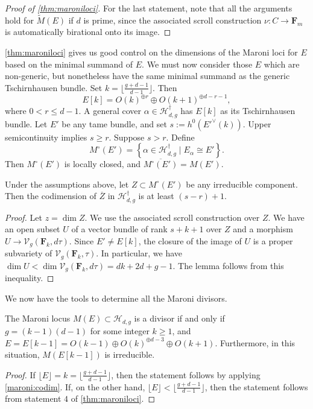 \documentclass{article}
\providecommand {\from}{{\colon}}
\renewcommand{\H}{\mathcal H}
\newcommand{\V}{\mathcal V}
\newcommand{\td}{\widetilde}
\newcommand{\F}{{\mathbf F}}
\numberwithin{equation}{section}
\begin{document}
\begin{proof}[Proof of \autoref{thm:maroniloci}]
For the last statement, note that all the arguments hold for $\td M(E)$ if $d$ is prime, since the associated scroll construction $\nu \from C \to \F_{m}$ is automatically birational onto its image.
\end{proof}

\autoref{thm:maroniloci} gives us good control on the dimensions of the Maroni loci for $E$ based on the minimal summand of $E$. We must now consider those $E$ which are non-generic, but nonetheless have the same minimal summand as the generic Tschirnhausen bundle. Set $k = \lfloor \frac{g+d-1}{d-1} \rfloor$. Then 
\[E[k] = O(k)^{\oplus r} \oplus O(k+1)^{\oplus d-r-1},\] 
where $0 < r \leq d-1$. A general cover $\alpha \in \H^\dagger_{d,g}$ has $E[k]$ as its Tschirnhausen bundle. Let $E'$ be any tame bundle, and set $s := h^{0}({E'}^\vee(k))$.  Upper semicontinuity implies $s \geq r$. Suppose $s > r$. Define
\[M^\circ(E') =\left\{ \alpha \in \H^\dagger_{d,g} \mid E_{\alpha} \cong E' \right\}.\]
Then $M^\circ(E')$ is locally closed, and $\overline {M^\circ(E')} = M(E')$.
\begin{lemma}\label{maroni:codim}
  Under the assumptions above, let $Z \subset M^\circ(E')$ be any irreducible component. Then the codimension of $\overline Z$ in $\H^\dagger_{d,g}$ is at least $(s-r)+1$.
\end{lemma}
\begin{proof}
  Let $z = \dim Z$. We use the associated scroll construction over $Z$. We have an open subset $U$ of a vector bundle of rank $s+k+1$ over $Z$ and a morphism $U \to \V_g(\F_k, d\tau)$. Since $E' \neq E[k]$, the closure of the image of $U$ is a proper subvariety of $\V_g(\F_k,\tau)$. In particular, we have $\dim U < \dim \V_g(\F_k, d\tau) = dk+2d+g-1$. The lemma follows from this inequality.
\end{proof}

We now have the tools to determine all the Maroni divisors.
\begin{proposition}\label{maronidivisor} 
  The Maroni locus $M(E) \subset \H_{d,g}$ is a divisor if and only if $g=(k-1)(d-1)$ for some integer $k\geq1$, and $E= E[k-1] = O(k-1) \oplus O(k)^{\oplus d-3} \oplus O(k+1)$.  Furthermore, in this situation, $M(E[k-1])$ is irreducible.
\end{proposition}
\begin{proof}
  If $\lfloor E \rfloor = k = \lfloor \frac{g+d-1}{d-1} \rfloor$, then the statement follows by applying \autoref{maroni:codim}.  If, on the other hand, $\lfloor E \rfloor <   \lfloor \frac{g+d-1}{d-1} \rfloor$, then the statement follows from statement $4$ of \autoref{thm:maroniloci}.
\end{proof}
\end{document}
